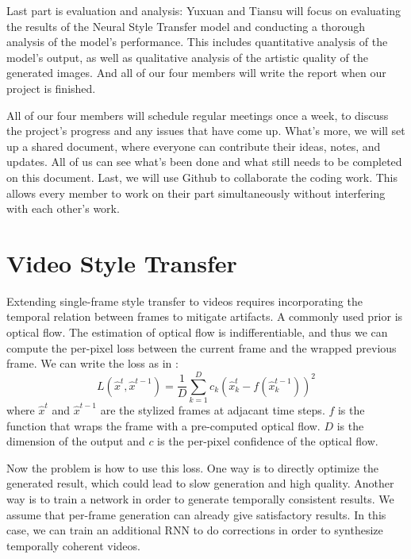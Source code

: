 \documentclass[10pt,twocolumn,letterpaper]{article}
\begin{document}
Last part is evaluation and analysis: Yuxuan and Tiansu will focus on evaluating the results of the Neural Style Transfer model and conducting a thorough analysis of the model's performance. This includes quantitative analysis of the model's output, as well as qualitative analysis of the artistic quality of the generated images. And all of our four members will write the report when our project is finished. 

All of our four members will schedule regular meetings once a week, to discuss the project's progress and any issues that have come up. What's more, we will set up a shared document, where everyone can contribute their ideas, notes, and updates. All of us can see what's been done and what still needs to be completed on this document. Last, we will use Github to collaborate the coding work. This allows every member to work on their part simultaneously without interfering with each other's work.
\section{Video Style Transfer}

Extending single-frame style transfer to videos requires incorporating the temporal relation between frames to mitigate artifacts. A commonly used prior is optical flow.
The estimation of optical flow is indifferentiable, and thus we can compute the per-pixel loss between the current frame and the wrapped previous frame. We can write the loss as in \cite{huang2017real}:
$$
\textit{L}(\hat{x}^t, \hat{x}^{t-1}) = \frac{1}{D}\sum_{k=1}^D c_k (\hat{x}_k^t-f(\hat{x}_k^{t-1}))^2
$$
where $\hat{x}^t$ and $\hat{x}^{t-1}$ are the stylized frames at adjacant time steps. $f$ is the function that wraps the frame with a pre-computed optical flow. $D$ is the dimension of the output and $c$ is the per-pixel confidence of the optical flow.

Now the problem is how to use this loss. One way\cite{ruder2016artistic} is to directly optimize the generated result, which could lead to slow generation and high quality. Another way\cite{huang2017real,chen2017coherent} is to train a network in order to generate temporally consistent results. We assume that per-frame generation can already give satisfactory results. In this case, we can train an additional RNN to do corrections in order to synthesize temporally coherent videos.

%
{\small


}
\end{document}
